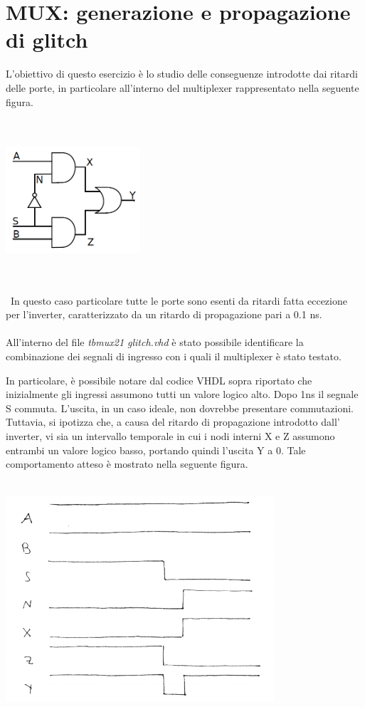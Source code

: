 \documentclass[11pt,  english, makeidx, a4paper, titlepage, oneside]{book}
\newenvironment{listato}{\footnotesize} {\normalsize }
\begin{document}
\section{MUX: generazione e propagazione di glitch}
L'obiettivo di questo esercizio è lo studio delle conseguenze 
introdotte dai ritardi delle porte, in particolare all'interno del
multiplexer rappresentato nella seguente figura.
\\\\\
\centerline{\includegraphics[width=5cm]{./img/Lab_1/Es_4/Mux.png}}
\\\\\
In questo caso particolare tutte le porte sono esenti da ritardi fatta
eccezione per l'inverter, caratterizzato da un ritardo di propagazione
pari a 0.1 ns.
\\\\
All'interno del file \textit{tb\textunderscore mux21\textunderscore
glitch.vhd} è stato possibile identificare la combinazione 
dei segnali di ingresso con i quali il multiplexer è stato
testato.
\begin{center}
\begin{listato}
	\centerline{}
\end{listato}
\end{center}
In particolare, è possibile notare dal codice VHDL sopra riportato
che inizialmente gli ingressi assumono tutti un valore logico alto.
Dopo 1ns il segnale S commuta. L'uscita, in un caso ideale, non dovrebbe
presentare commutazioni.
\\
Tuttavia, si ipotizza che, a causa del ritardo di propagazione introdotto dall'
inverter, vi sia un intervallo temporale in cui i nodi interni X e Z 
assumono entrambi un valore logico basso, portando quindi l'uscita Y a 0. Tale comportamento atteso è mostrato nella seguente figura.
\\\\
\centerline{\includegraphics[width=10cm]{./img/Lab_1/Es_4/Mux_plot.png}}
\end{document}
